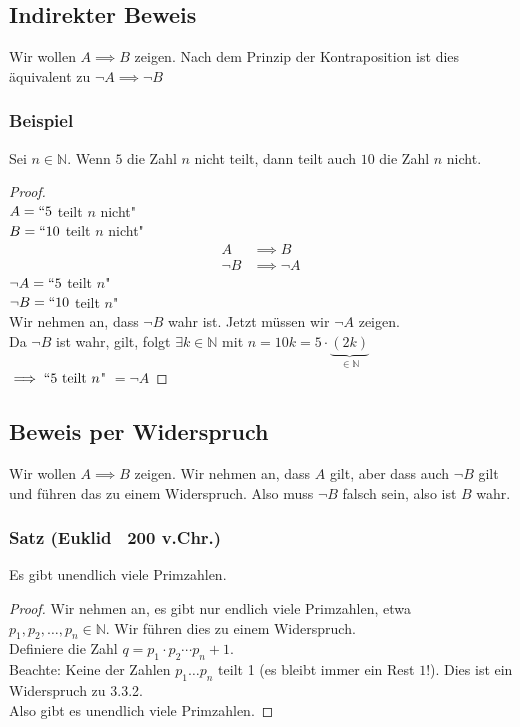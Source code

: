 \documentclass{article}
\begin{document}
  \subsection{Indirekter Beweis}
    Wir wollen $A \implies B$ zeigen. Nach dem Prinzip der Kontraposition ist
    dies äquivalent zu $\neg A \implies \neg B$

    \subsubsection{Beispiel}
      Sei $n \in \mathbb{N}$. Wenn $5$ die Zahl $n$ nicht teilt, dann teilt auch
      $10$ die Zahl $n$ nicht.
      \begin{proof} \mbox{} \\
        $A = ``5$ teilt $n$ nicht" \\
        $B = ``10$ teilt $n$ nicht"
        \begin{align*}
          A &\implies B \\
          \neg B &\implies \neg A
        \end{align*}
        $\neg A = `` 5$ teilt $n$" \\
        $\neg B = `` 10$ teilt $n$" \\
        Wir nehmen an, dass $\neg B$ wahr ist. Jetzt müssen wir $\neg A$ zeigen. \\
        Da $\neg B$ ist wahr, gilt, folgt $\exists k \in \mathbb{N}$
        mit $n=10k = 5 \cdot \underbrace{(2k)}_{\in \mathbb{N}}$ \\
        $\implies ``5 \text{ teilt } n$" $ = \neg A$
      \end{proof}

  \subsection{Beweis per Widerspruch}
    Wir wollen $A \implies B$ zeigen. Wir nehmen an, dass $A$ gilt, aber dass auch
    $\neg B$ gilt und führen das zu einem Widerspruch. Also muss $\neg B$ falsch
    sein, also ist $B$ wahr.

    \subsubsection{Satz (Euklid ~200 v.Chr.)}
      Es gibt unendlich viele Primzahlen.
      \begin{proof}
        Wir nehmen an, es gibt nur endlich viele Primzahlen, etwa \\
        $p_1, p_2, \dotsc, p_n \in \mathbb{N}$. Wir führen dies zu einem Widerspruch. \\
        Definiere die Zahl $q = p_1 \cdot p_2 \dotsm p_n +1$.\\
        Beachte: Keine der Zahlen $p_1 \dotso p_n$ teilt 1 (es bleibt immer ein
        Rest $1$!). Dies ist ein Widerspruch zu 3.3.2. \\
        Also gibt es unendlich viele Primzahlen.
      \end{proof}
\end{document}
